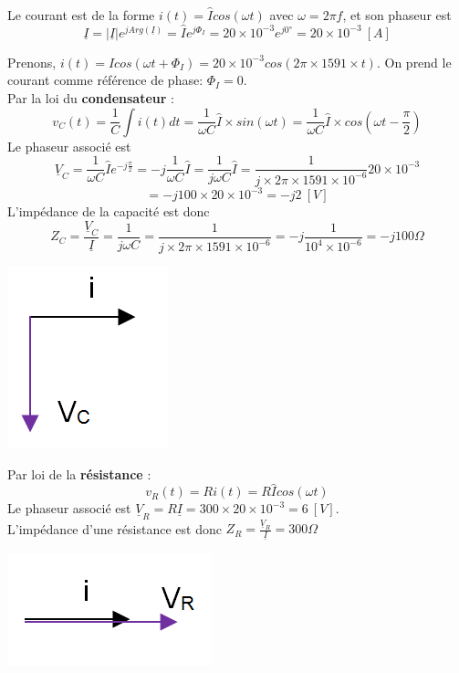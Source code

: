{
Le courant est de la forme $i(t)=\widehat{I} cos(\omega t)$  avec $\omega=2\pi f$, et son phaseur est $$\underline{I}=|\underline{I}|e^{jArg(\underline{I})}=\widehat{I}e^{j\Phi_I}=20\times 10^{-3}e^{j0°}=20\times 10^{-3}\ [A]$$

Prenons, $i(t)=\widehat{I}cos(\omega t+\Phi_I)=20\times 10^{-3}cos(2\pi \times 1591\times t)$. On prend le courant comme référence de phase: $\Phi_I=0$.\\
Par la loi du \textbf{condensateur} :
$$v_C(t)=\frac{1}{C} \int{i(t)dt}=\frac{1}{\omega C}\widehat{I}\times sin(\omega t)=\frac{1}{\omega C}\widehat{I}\times cos (\omega t-\frac{\pi}{2})$$
Le phaseur associé est
$$\underline{V}_C=\frac{1}{\omega C}\widehat{I}e^{-j\frac{\pi}{2}}=-j\frac{1}{\omega C}\widehat{I}=\frac{1}{j\omega C}\widehat{I}=\frac{1}{j\times 2\pi\times 1591\times 10^{-6}}20\times 10^{-3}$$
$$=-j100\times 20\times 10^{-3}=-j2\ [V]$$
L’impédance de la capacité est donc
$$Z_C=\frac{\underline{V}_C}{\underline{I}}=\frac{1}{j\omega C}=\frac{1}{j\times 2\pi \times 1591 \times 10^{-6}}=-j\frac{1}{10^4 \times 10^{-6}}=-j100\Omega$$
\vspace{-5mm}
\begin{center}
\includegraphics[scale=0.5]{TP1_EXO1b_Q2_1_C.PNG}
\end{center}

Par loi de la \textbf{résistance} :
$$v_R(t)=R i(t)=R\widehat{I} cos(\omega t)$$
Le phaseur associé est $\underline{V}_R=R\underline{I}=300\times 20\times 10^{-3}=6\ [V]$.\\
L'impédance d'une résistance est donc $Z_R=\frac{\underline{V}_R}{\underline{I}}=300\Omega$
\begin{center}
\includegraphics[scale=0.5]{TP1_EXO1b_Q2_1_R.PNG}
\end{center}

}
